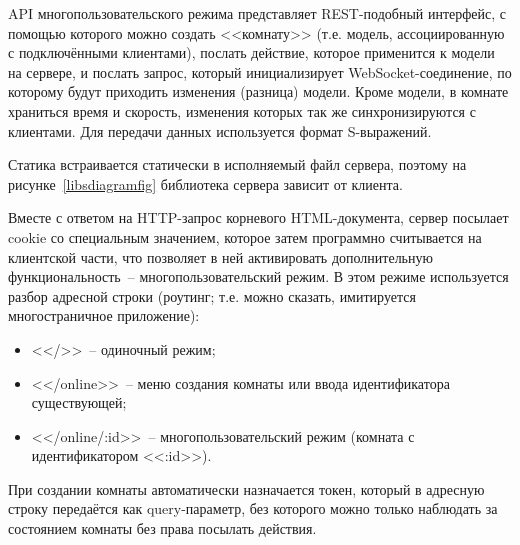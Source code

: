 API многопользовательского режима представляет REST-подобный интерфейс,
с помощью которого можно создать <<комнату>> (т.е. модель, ассоциированную с подключёнными клиентами),
послать действие, которое применится к модели на сервере, и послать запрос, который инициализирует WebSocket-соединение,
по которому будут приходить изменения (разница) модели. Кроме модели, в комнате храниться время и скорость,
изменения которых так же синхронизируются с клиентами. Для передачи данных используется формат S-выражений.

Статика встраивается статически в исполняемый файл сервера, поэтому на рисунке~\ref{libsdiagramfig} библиотека сервера зависит от клиента.

Вместе с ответом на HTTP-запрос корневого HTML-документа, сервер посылает cookie со специальным значением,
которое затем программно считывается на клиентской части, что позволяет в ней активировать дополнительную функциональность~--
многопользовательский режим. В этом режиме используется разбор адресной строки (роутинг; т.е. можно сказать,
имитируется многостраничное приложение):

\begin{itemize}
    \item <</>>~-- одиночный режим;
    \item <</online>>~-- меню создания комнаты или ввода идентификатора существующей;
    \item <</online/:id>>~-- многопользовательский режим (комната с идентификатором <<:id>>).
\end{itemize}

При создании комнаты автоматически назначается токен, который в адресную строку передаётся как query-параметр,
без которого можно только наблюдать за состоянием комнаты без права посылать действия.

